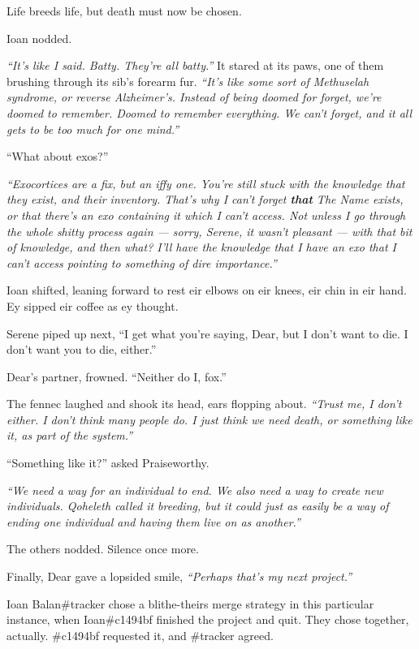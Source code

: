 Life breeds life, but death must now be chosen.

Ioan nodded.

\emph{``It's like I said. Batty. They're all batty.''} It stared at its paws, one of them brushing through its sib's forearm fur. \emph{``It's like some sort of Methuselah syndrome, or reverse Alzheimer's. Instead of being doomed for forget, we're doomed to remember. Doomed to remember everything. We can't forget, and it all gets to be too much for one mind.''}

``What about exos?''

\emph{``Exocortices are a fix, but an iffy one. You're still stuck with the knowledge that they exist, and their inventory. That's why I can't forget \textbf{that} The Name exists, or that there's an exo containing it which I can't access. Not unless I go through the whole shitty process again --- sorry, Serene, it wasn't pleasant --- with that bit of knowledge, and then what? I'll have the knowledge that I have an exo that I can't access pointing to something of dire importance.''}

Ioan shifted, leaning forward to rest eir elbows on eir knees, eir chin in eir hand. Ey sipped eir coffee as ey thought.

Serene piped up next, ``I get what you're saying, Dear, but I don't want to die. I don't want you to die, either.''

Dear's partner, frowned. ``Neither do I, fox.''

The fennec laughed and shook its head, ears flopping about. \emph{``Trust me, I don't either. I don't think many people do. I just think we need death, or something like it, as part of the system.''}

``Something like it?'' asked Praiseworthy.

\emph{``We need a way for an individual to end. We also need a way to create new individuals. Qoheleth called it breeding, but it could just as easily be a way of ending one individual and having them live on as another.''}

The others nodded. Silence once more.

Finally, Dear gave a lopsided smile, \emph{``Perhaps that's my next project.''}

\secdiv{}

\noindent Ioan Balan\#tracker chose a blithe-theirs merge strategy in this particular instance, when Ioan\#c1494bf finished the project and quit. They chose together, actually. \#c1494bf requested it, and \#tracker agreed.

